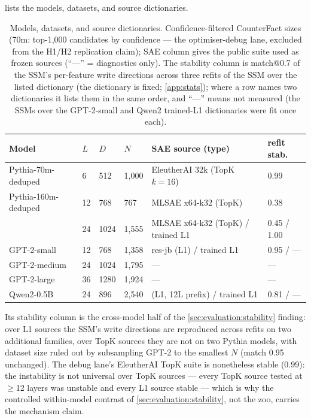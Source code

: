  lists the models, datasets, and source dictionaries.

\begin{table}[t]
  \centering
  \footnotesize
  \caption{Models, datasets, and source dictionaries. Confidence-filtered
  CounterFact sizes (70m: top-1{,}000 candidates by confidence --- the
  optimiser-debug lane, excluded from the H1/H2 replication claim); SAE
  column gives the public suite used as frozen sources (``---'' = diagnostics
  only). The stability column is match@0.7 of the SSM's per-feature write
  directions across three refits of the SSM over the listed dictionary (the
  dictionary is fixed; \cref{app:stats}); where a
  row names two dictionaries it lists them in the same order, and ``---'' means
  not measured (the SSMs over the GPT-2-small and Qwen2 trained-L1
  dictionaries were fit once each).}
  \label{tab:zoo}
  \begin{tabular}{llllll}
    \toprule
    Model & $L$ & $D$ & $N$ & SAE source (type) & refit stab. \\
    \midrule
    Pythia-70m-deduped   & 6  & 512  & 1{,}000 & EleutherAI 32k (TopK $k{=}16$) & 0.99 \\
    Pythia-160m-deduped  & 12 & 768  & 767     & MLSAE x64-k32 (TopK) & 0.38 \\
    \pythia{}            & 24 & 1024 & 1{,}555 & MLSAE x64-k32 (TopK) / trained L1 & 0.45 / 1.00 \\
    GPT-2-small          & 12 & 768  & 1{,}358 & res-jb (L1) / trained L1 & 0.95 / --- \\
    GPT-2-medium         & 24 & 1024 & 1{,}795 & --- & --- \\
    GPT-2-large          & 36 & 1280 & 1{,}924 & --- & --- \\
    Qwen2-0.5B           & 24 & 896  & 2{,}540 & \citet{chanin2024qwensaes} (L1, 12L prefix) / trained L1 & 0.81 / --- \\
    \bottomrule
  \end{tabular}
\end{table}

Its stability column is the cross-model half of the
\cref{sec:evaluation:stability} finding: over L1 sources the SSM's write
directions are reproduced across refits on two additional families, over
TopK sources they are not on two Pythia models, with dataset size ruled out by
subsampling GPT-2 to the smallest $N$ (match 0.95 unchanged). The debug
lane's EleutherAI TopK suite is nonetheless stable (0.99): the instability
is not universal over TopK sources --- every TopK source tested at $\ge$12
layers was unstable and every L1 source stable --- which is why the
controlled within-model contrast of \cref{sec:evaluation:stability}, not the
zoo, carries the mechanism claim.

